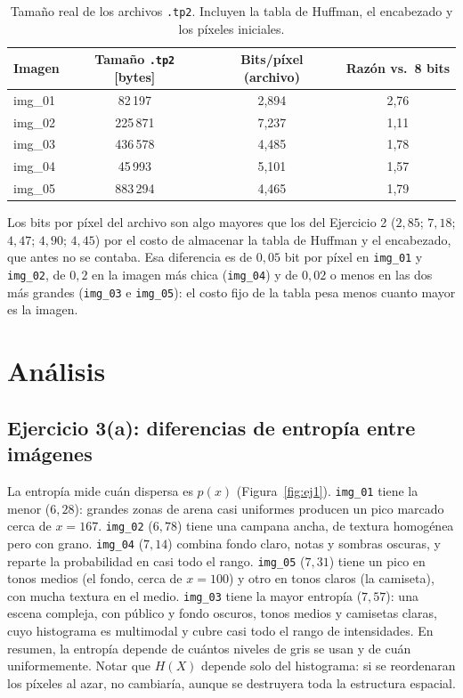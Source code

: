 \documentclass[11pt,a4paper]{article}
\begin{document}
\begin{table}[H]
\centering
\begin{tabular}{lccc}
\toprule
Imagen & Tamaño \texttt{.tp2} [bytes] & Bits/píxel (archivo) & Razón vs.\ 8 bits \\
\midrule
img\_01 & 82\,197 & 2,894 & 2,76 \\
img\_02 & 225\,871 & 7,237 & 1,11 \\
img\_03 & 436\,578 & 4,485 & 1,78 \\
img\_04 & 45\,993 & 5,101 & 1,57 \\
img\_05 & 883\,294 & 4,465 & 1,79 \\
\bottomrule
\end{tabular}
\caption{Tamaño real de los archivos \texttt{.tp2}. Incluyen la tabla de Huffman, el encabezado y los píxeles iniciales.}
\end{table}

Los bits por píxel del archivo son algo mayores que los del Ejercicio 2 ($2{,}85$; $7{,}18$; $4{,}47$; $4{,}90$; $4{,}45$) por el costo de almacenar la tabla de Huffman y el encabezado, que antes no se contaba. Esa diferencia es de $0{,}05$ bit por píxel en \texttt{img\_01} y \texttt{img\_02}, de $0{,}2$ en la imagen más chica (\texttt{img\_04}) y de $0{,}02$ o menos en las dos más grandes (\texttt{img\_03} e \texttt{img\_05}): el costo fijo de la tabla pesa menos cuanto mayor es la imagen.

\section{Análisis}
\subsection{Ejercicio 3(a): diferencias de entropía entre imágenes}
La entropía mide cuán dispersa es $p(x)$ (Figura~\ref{fig:ej1}). \texttt{img\_01} tiene la menor ($6{,}28$): grandes zonas de arena casi uniformes producen un pico marcado cerca de $x=167$. \texttt{img\_02} ($6{,}78$) tiene una campana ancha, de textura homogénea pero con grano. \texttt{img\_04} ($7{,}14$) combina fondo claro, notas y sombras oscuras, y reparte la probabilidad en casi todo el rango. \texttt{img\_05} ($7{,}31$) tiene un pico en tonos medios (el fondo, cerca de $x=100$) y otro en tonos claros (la camiseta), con mucha textura en el medio. \texttt{img\_03} tiene la mayor entropía ($7{,}57$): una escena compleja, con público y fondo oscuros, tonos medios y camisetas claras, cuyo histograma es multimodal y cubre casi todo el rango de intensidades. En resumen, la entropía depende de cuántos niveles de gris se usan y de cuán uniformemente.
Notar que $H(X)$ depende solo del histograma: si se reordenaran los píxeles al azar, no cambiaría, aunque se destruyera toda la estructura espacial.
\end{document}
